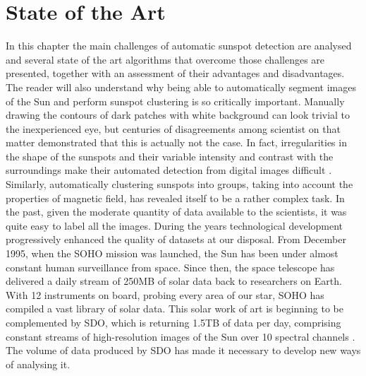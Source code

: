 \chapter{State of the Art}
\label{capitolo3}
\thispagestyle{empty}

\noindent In this chapter the main challenges of automatic sunspot detection are analysed and several state of the art algorithms that overcome those challenges are presented, together with an assessment of their advantages and disadvantages. The reader will also understand why being able to automatically segment images of the Sun and perform sunspot clustering is so critically important. Manually drawing the contours of dark patches with white background can look trivial to the inexperienced eye, but centuries of disagreements among scientist on that matter demonstrated that this is actually not the case. In fact, irregularities in the shape of the sunspots and their variable intensity and contrast with the surroundings make their automated detection from digital images difficult \cite{curto2008automatic}. Similarly, automatically clustering sunspots into groups, taking into account the properties of magnetic field, has revealed itself to be a rather complex task. In the past, given the moderate quantity of data available to the scientists, it was quite easy to label all the images. During the years technological development progressively enhanced the quality of datasets at our disposal. From December 1995, when the SOHO mission was launched, the Sun has been under almost constant human surveillance from space. Since then, the space telescope has delivered a daily stream of 250MB of solar data back to researchers on Earth. With 12 instruments on board, probing every area of our star, SOHO has compiled a vast library of solar data. This solar work of art is beginning to be complemented by SDO, which is returning 1.5TB of data per day, comprising constant streams of high-resolution images of the Sun over 10 spectral channels \cite{esa-soho}. The volume of data produced by SDO has made it necessary to develop new ways of analysing it.\\
